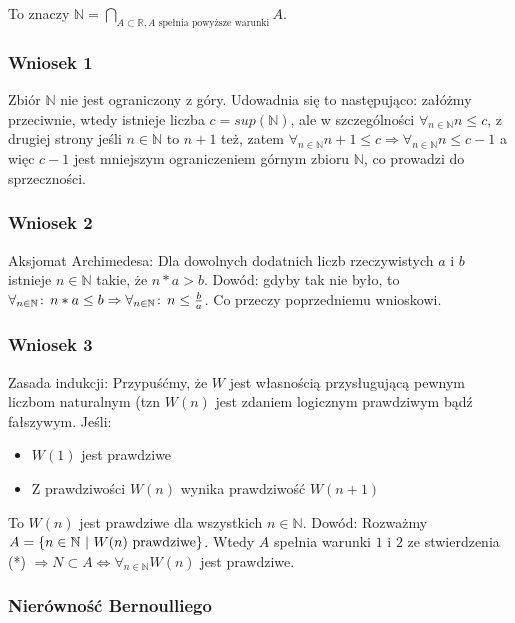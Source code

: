 \documentclass[9pt]{article}
\begin{document}
To znaczy $\mathbb{N} = \bigcap_{A \subset \mathbb{R}, A \text{ spełnia powyższe warunki}} A$.

\subsubsection*{Wniosek 1}
Zbiór $\mathbb{N}$ nie jest ograniczony z góry. Udowadnia się to następująco: załóżmy
przeciwnie, wtedy istnieje liczba $c = sup(\mathbb{N})$, ale w szczególności 
$\forall_{n \in \mathbb{N}} n \le c$, z drugiej strony jeśli $n \in \mathbb{N}$ to $n+1$ też, zatem
$\forall_{n \in \mathbb{N}} n+1 \le c \Rightarrow \forall_{n \in \mathbb{N}} n \le c-1$ a więc $c-1$
jest mniejszym ograniczeniem górnym zbioru $\mathbb{N}$, co prowadzi do sprzeczności.

\subsubsection*{Wniosek 2}
Aksjomat Archimedesa: Dla dowolnych dodatnich liczb rzeczywistych $a$ i $b$ istnieje $n \in
\mathbb{N}$ takie, że $n*a > b$. Dowód: gdyby tak nie było, to $\forall_{n \in \mathbb{N}} \! : \, n*a
\le b \Rightarrow \forall_{n \in \mathbb{N}} \! : \, n \le \frac{b}{a}$. Co przeczy poprzedniemu
wnioskowi.

\subsubsection*{Wniosek 3}

Zasada indukcji: Przypuśćmy, że $W$ jest własnością przysługującą pewnym liczbom naturalnym (tzn
$W(n)$ jest zdaniem logicznym prawdziwym bądź fałszywym. Jeśli:

\begin{itemize}
    \item $W(1)$ jest prawdziwe
    \item Z prawdziwości $W(n)$ wynika prawdziwość $W(n+1)$
\end{itemize}

To $W(n)$ jest prawdziwe dla wszystkich $n \in \mathbb{N}$. Dowód: Rozważmy $A = \{n \in \mathbb{N}
\ |\  W(n) \text { prawdziwe}\}$. Wtedy $A$ spełnia warunki $1$ i $2$ ze stwierdzenia (*) $\Rightarrow N \subset A
\iff \forall_{n \in \mathbb{N}} W(n)$ jest prawdziwe.

\subsubsection*{Nierówność Bernoulliego}
\end{document}
